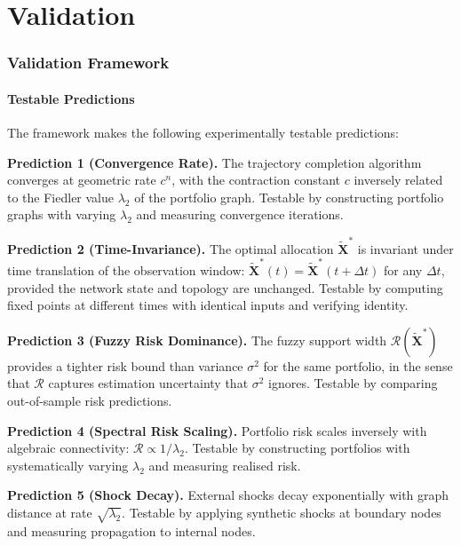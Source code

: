 \documentclass[twocolumn,10pt]{article}
\theoremstyle{remark}
\newcommand{\fuzzy}[1]{\tilde{#1}}
\begin{document}
\part{Validation}

\section{Validation Framework}
\label{sec:validation}

\subsection{Testable Predictions}

The framework makes the following experimentally testable predictions:

\textbf{Prediction 1 (Convergence Rate).}  The trajectory completion algorithm converges at geometric rate $c^n$, with the contraction constant $c$ inversely related to the Fiedler value $\lambda_2$ of the portfolio graph.  Testable by constructing portfolio graphs with varying $\lambda_2$ and measuring convergence iterations.

\textbf{Prediction 2 (Time-Invariance).}  The optimal allocation $\fuzzy{\mathbf{X}}^*$ is invariant under time translation of the observation window: $\fuzzy{\mathbf{X}}^*(t) = \fuzzy{\mathbf{X}}^*(t + \Delta t)$ for any $\Delta t$, provided the network state and topology are unchanged.  Testable by computing fixed points at different times with identical inputs and verifying identity.

\textbf{Prediction 3 (Fuzzy Risk Dominance).}  The fuzzy support width $\mathcal{R}(\fuzzy{\mathbf{X}}^*)$ provides a tighter risk bound than variance $\sigma^2$ for the same portfolio, in the sense that $\mathcal{R}$ captures estimation uncertainty that $\sigma^2$ ignores.  Testable by comparing out-of-sample risk predictions.

\textbf{Prediction 4 (Spectral Risk Scaling).}  Portfolio risk scales inversely with algebraic connectivity: $\mathcal{R} \propto 1/\lambda_2$.  Testable by constructing portfolios with systematically varying $\lambda_2$ and measuring realised risk.

\textbf{Prediction 5 (Shock Decay).}  External shocks decay exponentially with graph distance at rate $\sqrt{\lambda_2}$.  Testable by applying synthetic shocks at boundary nodes and measuring propagation to internal nodes.
\end{document}
